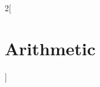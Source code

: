 \documentclass[../../../main_math.tex]{subfiles}
\begin{document}
\begin{multicols}{2}[\section{Arithmetic}]

\end{multicols}
\end{document}
